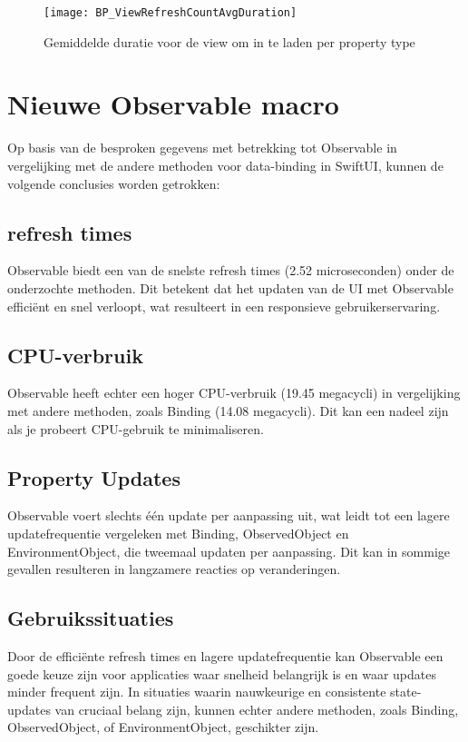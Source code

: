 \begin{figure}[htbp]
    \centering
    \texttt{[image: BP\_ViewRefreshCountAvgDuration]} 
    \caption{Gemiddelde duratie voor de view om in te laden per property type}
    \label{fig:propertyRefreshDuration}
\end{figure}

\newpage
\section{Nieuwe Observable macro}
Op basis van de besproken gegevens met betrekking tot Observable in vergelijking met de andere methoden voor data-binding in SwiftUI, kunnen de volgende conclusies worden getrokken:
\subsection{refresh times}
Observable biedt een van de snelste refresh times (2.52 microseconden) onder de onderzochte methoden. Dit betekent dat het updaten van de UI met Observable efficiënt en snel verloopt, wat resulteert in een responsieve gebruikerservaring.
\subsection{CPU-verbruik}
Observable heeft echter een hoger CPU-verbruik (19.45 megacycli) in vergelijking met andere methoden, zoals Binding (14.08 megacycli). Dit kan een nadeel zijn als je probeert CPU-gebruik te minimaliseren.
\subsection{Property Updates}
Observable voert slechts één update per aanpassing uit, wat leidt tot een lagere updatefrequentie vergeleken met Binding, ObservedObject en EnvironmentObject, die tweemaal updaten per aanpassing. Dit kan in sommige gevallen resulteren in langzamere reacties op veranderingen.
\subsection{Gebruikssituaties}
Door de efficiënte refresh times en lagere updatefrequentie kan Observable een goede keuze zijn voor applicaties waar snelheid belangrijk is en waar updates minder frequent zijn. In situaties waarin nauwkeurige en consistente state-updates van cruciaal belang zijn, kunnen echter andere methoden, zoals Binding, ObservedObject, of EnvironmentObject, geschikter zijn.
 
